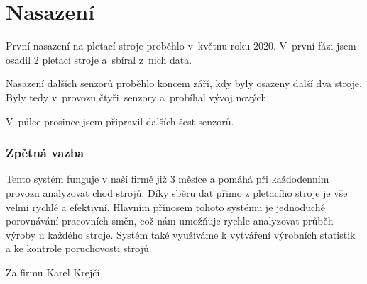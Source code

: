 \chapter{Nasazení}
První nasazení na pletací stroje proběhlo v~květnu roku 2020.
V~první fázi jsem osadil 2 pletací stroje a~sbíral z~nich data.

Nasazení dalších senzorů proběhlo koncem září, kdy byly osazeny další dva stroje.
Byly tedy v~provozu čtyři~senzory a~probíhal vývoj nových.

V~půlce prosince jsem připravil dalších šest senzorů.


\subsection{Zpětná vazba}
\newline

Tento systém funguje v naší firmě již 3 měsíce a pomáhá při každodenním provozu analyzovat chod strojů.
Díky sběru dat přimo z pletacího stroje je vše velmi rychlé a efektivní.
Hlavním přínosem tohoto systému je jednoduché porovnávání pracovních směn, což nám umožňuje rychle analyzovat průběh výroby u každého stroje.
Systém také využíváme k vytváření výrobních statistik a ke kontrole poruchovosti strojů.

{\raggedleft Za firmu Karel Krejčí\par}



\newpage